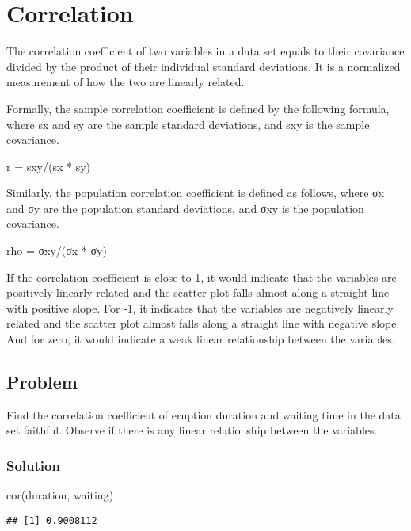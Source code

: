 \documentclass[
]{article}
\newenvironment{Shaded}{\begin{snugshade}}{\end{snugshade}}
\newcommand{\FunctionTok}[1]{\textcolor[rgb]{0.00,0.00,0.00}{#1}}
\newcommand{\NormalTok}[1]{#1}
\begin{document}
\hypertarget{correlation}{%
\section{Correlation}\label{correlation}}

The correlation coefficient of two variables in a data set equals to
their covariance divided by the product of their individual standard
deviations. It is a normalized measurement of how the two are linearly
related.

Formally, the sample correlation coefficient is defined by the following
formula, where sx and sy are the sample standard deviations, and sxy is
the sample covariance.

r = sxy/(sx * sy)

Similarly, the population correlation coefficient is defined as follows,
where σx and σy are the population standard deviations, and σxy is the
population covariance.

rho = σxy/(σx * σy)

If the correlation coefficient is close to 1, it would indicate that the
variables are positively linearly related and the scatter plot falls
almost along a straight line with positive slope. For -1, it indicates
that the variables are negatively linearly related and the scatter plot
almost falls along a straight line with negative slope. And for zero, it
would indicate a weak linear relationship between the variables.

\hypertarget{problem-1}{%
\subsection{Problem}\label{problem-1}}

Find the correlation coefficient of eruption duration and waiting time
in the data set faithful. Observe if there is any linear relationship
between the variables.

\hypertarget{solution-1}{%
\subsubsection{Solution}\label{solution-1}}

\begin{Shaded}
\begin{Highlighting}[]
\FunctionTok{cor}\NormalTok{(duration, waiting)}
\end{Highlighting}
\end{Shaded}

\begin{verbatim}
## [1] 0.9008112
\end{verbatim}
\end{document}

